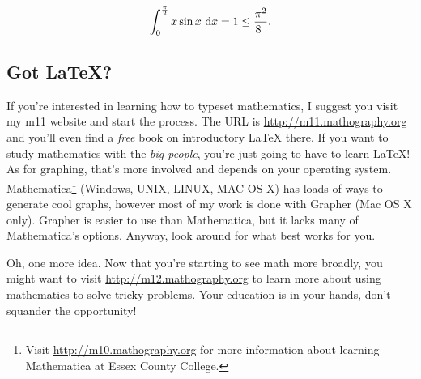 \documentclass[12pt,addpoints, answers, fleqn]{exam}
\begin{document}
\[
\int_0^{\frac{\pi}{2}} x \sin x \ {\rm{d}}x =  1 \leq \frac{\pi^2}{8^{\phantom{2}}}.
\]

\subsection{Got \LaTeX?}
If you're interested in learning how to typeset mathematics, I suggest you visit my m11 website and start the process. The URL is \url{http://m11.mathography.org} and you'll even find a \emph{free} book on introductory \LaTeX{} there. If you want to study mathematics with the \emph{big-people}, you're just going to have to learn \LaTeX! As  for graphing, that's more involved and depends on your operating system. Mathematica\footnote{Visit \url{http://m10.mathography.org} for more information about learning Mathematica at Essex County College.} (Windows, UNIX, LINUX, MAC OS X) has loads of ways to generate cool graphs, however most of my work is done with Grapher (Mac OS X only). Grapher is easier to use than Mathematica, but it lacks many of Mathematica's options. Anyway, look around for what best works for you.



Oh, one more idea. Now that you're starting to see math more broadly, you might want to visit \url{http://m12.mathography.org} to learn more about using mathematics to solve tricky problems. Your education is in your hands, don't squander the opportunity! 
\end{document}
